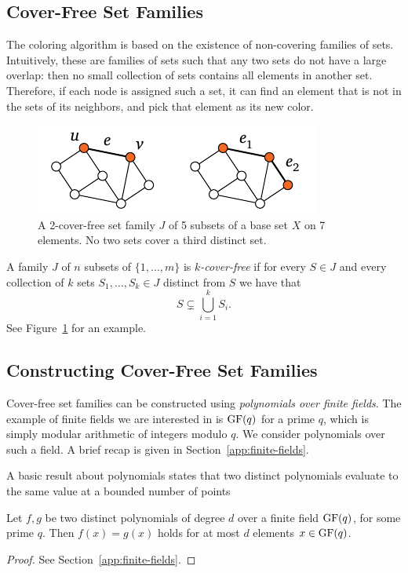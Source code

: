 \subsection{Cover-Free Set Families}

The coloring algorithm is based on the existence of non-covering families of sets. Intuitively, these are families of sets such that any two sets do not have a large overlap: then no small collection of sets contains all elements in another set. Therefore, if each node is assigned such a set, it can find an element that is not in the sets of its neighbors, and pick that element as its new color.

\begin{figure}
  \centering
  \includegraphics[scale=0.4,page=\PCoverFreeSet]{figs.pdf}
  \caption{A 2-cover-free set family $J$ of 5 subsets of a base set $X$ on 7 elements. No two sets cover a third distinct set.}\label{fig:cover-free-sets}
\end{figure}

A family $J$ of $n$ subsets of $\{1, \dots, m \}$ is \emph{$k$-cover-free} if for every $S \in J$ and every collection of $k$ sets $S_1, \dots, S_k \in J$ distinct from $S$ we have that
\[
  S \subsetneq \bigcup_{i=1}^{k} S_i.
\]
See Figure~\ref{fig:cover-free-sets} for an example.

\subsection{Constructing Cover-Free Set Families}

Cover-free set families can be constructed using \emph{polynomials over finite fields}. The example of finite fields we are interested in is $\operatorname{GF}(q)$ for a prime $q$, which is simply modular arithmetic of integers modulo $q$. We consider polynomials over such a field. A brief recap is given in Section~\ref{app:finite-fields}.

A basic result about polynomials states that two distinct polynomials evaluate to the same value at a bounded number of points

\begin{lemma} \label{lem:poly-roots}
  Let $f,g$ be two distinct polynomials of degree $d$ over a finite field $\operatorname{GF}(q)$, for some prime $q$. Then $f(x) = g(x)$ holds for at most $d$ elements $x \in \operatorname{GF}(q)$.
\end{lemma}
\begin{proof}
See Section~\ref{app:finite-fields}.
\end{proof}

